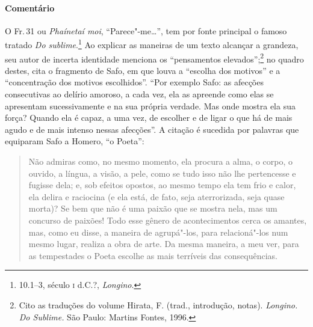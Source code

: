 {\paragraph{Comentário} O Fr.\,31 ou \textit{Phaínetaí moi}, ``Parece"-me\ldots{}'', tem por fonte
principal o famoso tratado \textit{Do sublime}.\footnote{10.1--3, século \textsc{i} d.C.?, \textit{Longino}.} Ao
explicar as maneiras de um texto alcançar a grandeza, seu autor de incerta identidade menciona os
``pensamentos elevados'';\footnote{ Cito as traduções do volume Hirata,
F. (trad., introdução, notas). \textit{Longino.} \textit{Do Sublime.} São
Paulo: Martins Fontes, 1996.} no quadro destes, cita o fragmento de Safo,
em que louva a ``escolha dos motivos'' e a ``concentração dos
motivos escolhidos''. ``Por exemplo Safo: as afecções consecutivas ao delírio
amoroso, a cada vez, ela as apreende como elas se apresentam sucessivamente e
na sua própria verdade. Mas onde mostra ela sua força? Quando ela é capaz, a
uma vez, de escolher e de ligar o que há de mais agudo e de mais
intenso nessas afecções''. A citação é sucedida por palavras que equiparam Safo
a Homero, ``o Poeta'': 
\pagebreak
\begin{quote}
Não admiras como, no mesmo momento, ela
procura a alma, o corpo, o ouvido, a língua, a visão, a pele, como se tudo isso
não lhe pertencesse e fugisse dela; e, sob efeitos opostos, ao mesmo tempo ela
tem frio e calor, ela delira e raciocina (e ela está, de fato, seja
aterrorizada, seja quase morta)? Se bem que não é uma paixão que se mostra
nela, mas um concurso de paixões! Todo esse gênero de acontecimentos cerca os
amantes, mas, como eu disse, a maneira de agrupá"-los, para relacioná"-los num
mesmo lugar, realiza a obra de arte. Da mesma maneira, a meu ver, para as
tempestades o Poeta escolhe as mais terríveis das consequências.
\end{quote}

}
